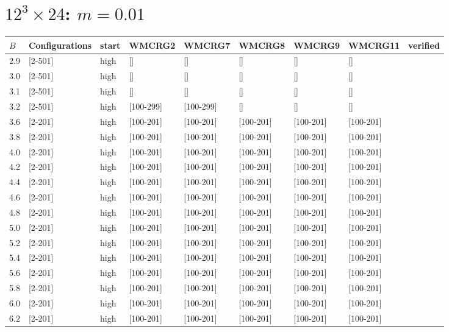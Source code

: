 \documentclass{article}
\begin{document}
  \section*{$12^3\times24$:  $m=0.01$}
    \begin{tabular}{| l | l | l | l | l | l | l | l | l |}
      \hline
      $B$ & Configurations & start & WMCRG2 & WMCRG7 & WMCRG8 & WMCRG9 & WMCRG11 & verified\\
      \hline
      2.9 & [2-501] & high & [] & [] & [] & [] & [] &\\
      3.0 & [2-501] & high & [] & [] & [] & [] & [] &\\
      3.1 & [2-501] & high & [] & [] & [] & [] & [] &\\
      3.2 & [2-501] & high & [100-299] & [100-299] & [] & [] & [] &\\
      3.6 & [2-201] & high & [100-201] & [100-201] & [100-201] & [100-201] & [100-201] &\\
      3.8 & [2-201] & high & [100-201] & [100-201] & [100-201] & [100-201] & [100-201] &\\
      4.0 & [2-201] & high & [100-201] & [100-201] & [100-201] & [100-201] & [100-201] &\\
      4.2 & [2-201] & high & [100-201] & [100-201] & [100-201] & [100-201] & [100-201] &\\
      4.4 & [2-201] & high & [100-201] & [100-201] & [100-201] & [100-201] & [100-201] &\\
      4.6 & [2-201] & high & [100-201] & [100-201] & [100-201] & [100-201] & [100-201] &\\
      4.8 & [2-201] & high & [100-201] & [100-201] & [100-201] & [100-201] & [100-201] &\\
      5.0 & [2-201] & high & [100-201] & [100-201] & [100-201] & [100-201] & [100-201] &\\
      5.2 & [2-201] & high & [100-201] & [100-201] & [100-201] & [100-201] & [100-201] &\\
      5.4 & [2-201] & high & [100-201] & [100-201] & [100-201] & [100-201] & [100-201] &\\
      5.6 & [2-201] & high & [100-201] & [100-201] & [100-201] & [100-201] & [100-201] &\\
      5.8 & [2-201] & high & [100-201] & [100-201] & [100-201] & [100-201] & [100-201] &\\
      6.0 & [2-201] & high & [100-201] & [100-201] & [100-201] & [100-201] & [100-201] &\\
      6.2 & [2-201] & high & [100-201] & [100-201] & [100-201] & [100-201] & [100-201] &\\

\end{tabular}
\end{document}
